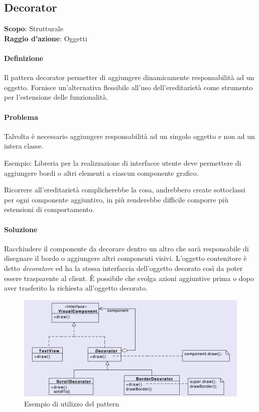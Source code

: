 \subsection{Decorator}

\textbf{Scopo}: Strutturale \\
\textbf{Raggio d'azione}: Oggetti

\paragraph{Definizione} Il pattern decorator permetter di aggiungere dinamicamente responsabilità ad un oggetto. Fornisce un'alternativa flessibile all'uso dell'ereditarietà come strumento per l'estensione delle funzionalità.

\paragraph{Problema} Talvolta è necessario aggiungere responsabilità ad un singolo oggetto e non ad un intera classe.

Esempio: Libreria per la realizzazione di interfacce utente deve permettere di aggiungere bordi o altri elementi a ciascun componente grafico.

Ricorrere all'ereditarietà complicherebbe la cosa, andrebbero create sottoclassi per ogni componente aggiuntivo, in più renderebbe difficile comporre più estensioni di comportamento.

\paragraph{Soluzione} Racchiudere il componente da decorare dentro un altro che sarà responsabile di disegnare il bordo o aggiungere altri componenti visivi. L'oggetto contenitore è detto \textit{decoratore} ed ha la stessa interfaccia dell'oggetto decorato così da poter essere trasparente al client. È possibile che svolga azioni aggiuntive prima o dopo aver trasferito la richiesta all'oggetto decorato.

\begin{figure}[H]
    \centering
    \includegraphics[width=1\linewidth]{assets/pattern/decorator/decorator-esempio.png}
    \caption{Esempio di utilizzo del pattern}
\end{figure}

